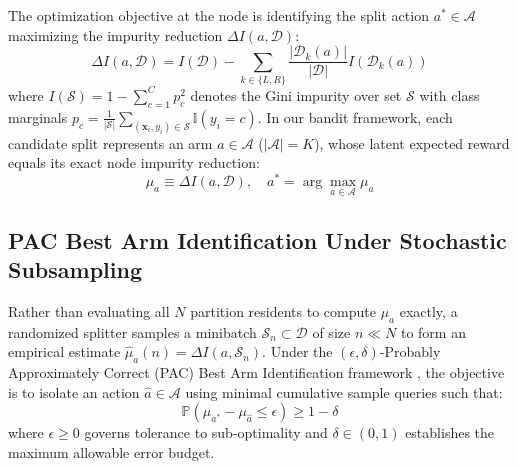 The optimization objective at the node is identifying the split action $a^* \in \mathcal{A}$ maximizing the impurity reduction $\Delta I(a, \mathcal{D})$:
\begin{equation}
\Delta I(a, \mathcal{D}) = I(\mathcal{D}) - \sum_{k \in \{L, R\}} \frac{|\mathcal{D}_k(a)|}{|\mathcal{D}|} I(\mathcal{D}_k(a))
\label{eq:gini_gain}
\end{equation}
where $I(\mathcal{S}) = 1 - \sum_{c=1}^C p_c^2$ denotes the Gini impurity over set $\mathcal{S}$ with class marginals $p_c = \frac{1}{|\mathcal{S}|} \sum_{(\mathbf{x}_i, y_i) \in \mathcal{S}} \mathbb{I}(y_i = c)$. In our bandit framework, each candidate split represents an arm $a \in \mathcal{A}$ ($|\mathcal{A}| = K$), whose latent expected reward equals its exact node impurity reduction:
\begin{equation}
\mu_a \equiv \Delta I(a, \mathcal{D}), \quad a^* = \arg\max_{a \in \mathcal{A}} \mu_a
\end{equation}

\subsection{PAC Best Arm Identification Under Stochastic Subsampling}
Rather than evaluating all $N$ partition residents to compute $\mu_a$ exactly, a randomized splitter samples a minibatch $\mathcal{S}_n \subset \mathcal{D}$ of size $n \ll N$ to form an empirical estimate $\hat{\mu}_a(n) = \Delta I(a, \mathcal{S}_n)$. Under the $(\epsilon, \delta)$-Probably Approximately Correct (PAC) Best Arm Identification framework \cite{evendar2006action,kaufmann2016complexity}, the objective is to isolate an action $\hat{a} \in \mathcal{A}$ using minimal cumulative sample queries such that:
\begin{equation}
\mathbb{P}\left(\mu_{a^*} - \mu_{\hat{a}} \le \epsilon \right) \ge 1 - \delta
\end{equation}
where $\epsilon \ge 0$ governs tolerance to sub-optimality and $\delta \in (0, 1)$ establishes the maximum allowable error budget.

